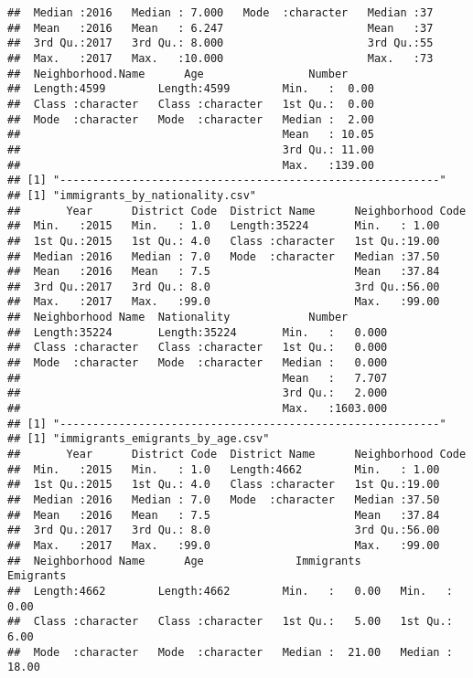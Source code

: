 \documentclass[
]{article}
\begin{document}
\begin{verbatim}
##  Median :2016   Median : 7.000   Mode  :character   Median :37       
##  Mean   :2016   Mean   : 6.247                      Mean   :37       
##  3rd Qu.:2017   3rd Qu.: 8.000                      3rd Qu.:55       
##  Max.   :2017   Max.   :10.000                      Max.   :73       
##  Neighborhood.Name      Age                Number      
##  Length:4599        Length:4599        Min.   :  0.00  
##  Class :character   Class :character   1st Qu.:  0.00  
##  Mode  :character   Mode  :character   Median :  2.00  
##                                        Mean   : 10.05  
##                                        3rd Qu.: 11.00  
##                                        Max.   :139.00  
## [1] "----------------------------------------------------------"
## [1] "immigrants_by_nationality.csv"
##       Year      District Code  District Name      Neighborhood Code
##  Min.   :2015   Min.   : 1.0   Length:35224       Min.   : 1.00    
##  1st Qu.:2015   1st Qu.: 4.0   Class :character   1st Qu.:19.00    
##  Median :2016   Median : 7.0   Mode  :character   Median :37.50    
##  Mean   :2016   Mean   : 7.5                      Mean   :37.84    
##  3rd Qu.:2017   3rd Qu.: 8.0                      3rd Qu.:56.00    
##  Max.   :2017   Max.   :99.0                      Max.   :99.00    
##  Neighborhood Name  Nationality            Number        
##  Length:35224       Length:35224       Min.   :   0.000  
##  Class :character   Class :character   1st Qu.:   0.000  
##  Mode  :character   Mode  :character   Median :   0.000  
##                                        Mean   :   7.707  
##                                        3rd Qu.:   2.000  
##                                        Max.   :1603.000  
## [1] "----------------------------------------------------------"
## [1] "immigrants_emigrants_by_age.csv"
##       Year      District Code  District Name      Neighborhood Code
##  Min.   :2015   Min.   : 1.0   Length:4662        Min.   : 1.00    
##  1st Qu.:2015   1st Qu.: 4.0   Class :character   1st Qu.:19.00    
##  Median :2016   Median : 7.0   Mode  :character   Median :37.50    
##  Mean   :2016   Mean   : 7.5                      Mean   :37.84    
##  3rd Qu.:2017   3rd Qu.: 8.0                      3rd Qu.:56.00    
##  Max.   :2017   Max.   :99.0                      Max.   :99.00    
##  Neighborhood Name      Age              Immigrants        Emigrants     
##  Length:4662        Length:4662        Min.   :   0.00   Min.   :  0.00  
##  Class :character   Class :character   1st Qu.:   5.00   1st Qu.:  6.00  
##  Mode  :character   Mode  :character   Median :  21.00   Median : 18.00  

\end{verbatim}
\end{document}

